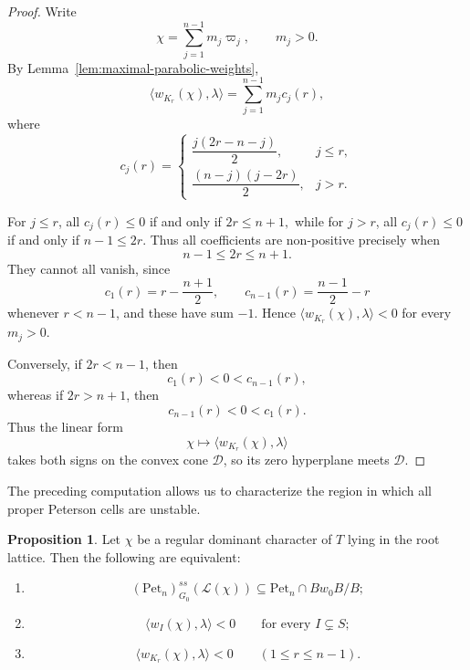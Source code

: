 \documentclass[12pt, reqno]{amsart}
\theoremstyle{plain}
\numberwithin{equation}{section}
\theoremstyle{definition}
\newtheorem{proposition}[theorem]{Proposition}
\begin{document}
\begin{proof}
Write
\[
\chi=\sum_{j=1}^{n-1}m_j\varpi_j,
\qquad m_j>0.
\]
By Lemma~\ref{lem:maximal-parabolic-weights},
\[
\langle w_{K_r}(\chi),\lambda\rangle
=
\sum_{j=1}^{n-1}m_jc_j(r),
\]
where
\[
c_j(r)=
\begin{cases}
\dfrac{j(2r-n-j)}2, & j\le r,\\[6pt]
\dfrac{(n-j)(j-2r)}2, & j>r.
\end{cases}
\]

For \(j\le r\), all \(c_j(r)\le0\) if and only if $2r\le n+1,$ while for \(j>r\), all \(c_j(r)\le0\) if and only if $n-1\le2r.$ 
Thus all coefficients are non-positive precisely when
\[
n-1\le2r\le n+1.
\]
They cannot all vanish, since
\[
c_1(r)=r-\frac{n+1}{2},
\qquad
c_{n-1}(r)=\frac{n-1}{2}-r
\]
whenever \(r<n-1\), and these have sum \(-1\). Hence $\langle w_{K_r}(\chi),\lambda\rangle<0$ for every \(m_j>0\).

Conversely, if \(2r<n-1\), then
\[
c_1(r)<0<c_{n-1}(r),
\]
whereas if \(2r>n+1\), then
\[
c_{n-1}(r)<0<c_1(r).
\]
Thus the linear form
\[
\chi\longmapsto
\langle w_{K_r}(\chi),\lambda\rangle
\]
takes both signs on the convex cone \(\mathcal D\), so its zero
hyperplane meets \(\mathcal D\).
\end{proof}

The preceding computation allows us to characterize the region in
which all proper Peterson cells are unstable.

\begin{proposition}\label{prop:deep-chamber-characterization}
Let \(\chi\) be a regular dominant character of \(T\) lying in the
root lattice. Then the following are equivalent:
\begin{enumerate}
\item
\[
(\mathrm{Pet}_n)^{ss}_{G_0}(\mathcal L(\chi))
\subseteq
\mathrm{Pet}_n\cap Bw_0B/B;
\]

\item
\[
\langle w_I(\chi),\lambda\rangle<0
\qquad\text{for every }I\subsetneq S;
\]

\item
\[
\langle w_{K_r}(\chi),\lambda\rangle<0
\qquad(1\le r\le n-1).
\]
\end{enumerate}
\end{proposition}
\end{document}
